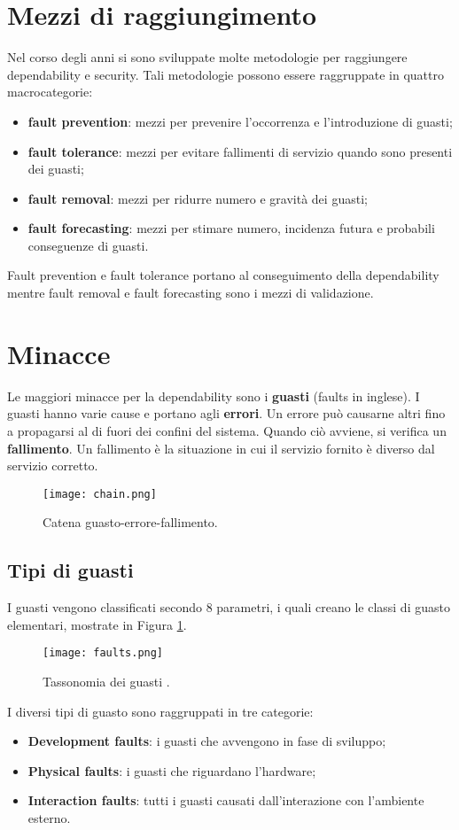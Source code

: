 \section{Mezzi di raggiungimento}
Nel corso degli anni si sono sviluppate molte metodologie per raggiungere dependability e security. Tali metodologie possono essere raggruppate in quattro macrocategorie:
\begin{itemize}
    \item \textbf{fault prevention}: mezzi per prevenire l'occorrenza e l'introduzione di guasti;
    \item \textbf{fault tolerance}: mezzi per evitare fallimenti di servizio quando sono presenti dei guasti;
    \item \textbf{fault removal}: mezzi per ridurre numero e gravità dei guasti;
    \item \textbf{fault forecasting}: mezzi per stimare numero, incidenza futura e probabili conseguenze di guasti.
\end{itemize}
Fault prevention e fault tolerance portano al conseguimento della dependability mentre fault removal e fault forecasting sono i mezzi di validazione.
\section{Minacce}
Le maggiori minacce per la dependability sono i \textbf{guasti} (faults in inglese). I guasti hanno varie cause e portano agli \textbf{errori}. Un errore può causarne altri fino a propagarsi
al di fuori dei confini del sistema. Quando ciò avviene, si verifica un \textbf{fallimento}. Un fallimento è la situazione in cui il servizio fornito
è diverso dal servizio corretto.
\begin{figure}[h]
    \texttt{[image: chain.png]}
    \caption{Catena guasto-errore-fallimento.}
\end{figure}
\subsection{Tipi di guasti}
I guasti vengono classificati secondo 8 parametri, i quali creano le classi di guasto elementari, mostrate in Figura \ref{fig:tax}.
\begin{figure}[h]
    \texttt{[image: faults.png]}
    \caption{Tassonomia dei guasti \cite{tax}.}
    \label{fig:tax}
\end{figure}
 I diversi tipi di guasto sono raggruppati in tre categorie:
 \begin{itemize}
     \item \textbf{Development faults}: i guasti che avvengono in fase di sviluppo;
     \item \textbf{Physical faults}: i guasti che riguardano l'hardware;
     \item \textbf{Interaction faults}: tutti i guasti causati dall'interazione con l'ambiente esterno.
 \end{itemize}
 \newpage
